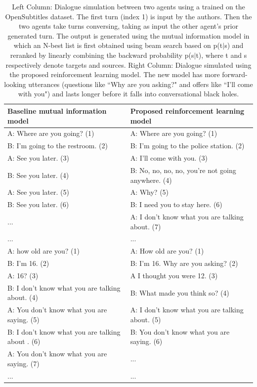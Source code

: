 \begin{table}
\centering
\small
\begin{tabular}{ll}\toprule
{\bf Baseline mutual information model}  & {\bf Proposed reinforcement learning model} \\\midrule
\textsc{A}: {Where are you going?} (1)             & A: Where are you going? (1)   \\
\textsc{B}: {I'm going to the restroom}. (2)    & B: I'm going to the police station. (2) \\
\textsc{A}: {See you later}. (3)			    & A: I'll come with you. (3) \\
\textsc{B}: {See you later}. (4)			    & B: No, no, no, no, you're not going anywhere. (4) \\
\textsc{A}: {See you later}. (5)		    & A: Why? (5) \\
\textsc{B}: {See you later}. (6)			    & B: I need you to stay here. (6)\\
...	&								    A: I don't know what you are talking about. (7)\\
...& ... \\\midrule
\textsc{A}: {how old are you?} (1) & A: How old are you? (1)\\
\textsc{B}: {I'm 16.} (2)& B: I'm 16. Why are you asking? (2)\\
\textsc{A}: {16?} (3) & A I thought you were 12. (3) \\
\textsc{B}: {I don't know what you are talking about.} (4) & B: What made you think so? (4)\\
\textsc{A}: {You don't know what you are saying.} (5) & A: I don't know what you are talking about. (5)\\
\textsc{B}: {I don't know what you are talking about .} (6) & B: You don't know what you are saying. (6)\\
\textsc{A}: {You don't know what you are saying.} (7) & ... \\
... & ... \\\bottomrule
\end{tabular}					
\caption[Dialogue simulation between two agents using \sts models]{ Left Column: Dialogue simulation between two agents using  a \sts trained on the OpenSubtitles dataset. The first turn (index 1) is input by the authors. Then the two agents take turns conversing, taking as input the other agent's prior generated turn. The output is generated using the mutual information model \cite{li2015diversity} in which an N-best list is first obtained using beam search based on p(t$|$s) and reranked by linearly combining the backward probability p(s$|$t), where t  and s respectively denote targets and  sources.  Right Column: Dialogue simulated using the proposed reinforcement learning model. The new model has more forward-looking utterances (questions like ``Why are you asking?" and offers like ``I'll come with you") and lasts longer before it falls into conversational black holes.}
\label{con-simulation}	
\end{table}

